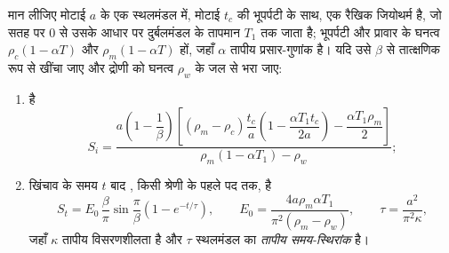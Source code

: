 \begin{proposition}[खिंचाव प्रतिरूप में अवधसान]\label{prop:b2:basins-compared:stretching}
मान लीजिए मोटाई $a$ के एक स्थलमंडल में, मोटाई $t_c$ की भूपर्पटी के साथ, एक रैखिक जियोथर्म है, जो
सतह पर $0$ से उसके आधार पर दुर्बलमंडल के तापमान $T_1$ तक जाता है; भूपर्पटी और प्रावार के
घनत्व $\rho_c(1 - \alpha T)$ और $\rho_m(1 - \alpha T)$ हों, जहाँ $\alpha$ तापीय
प्रसार-गुणांक है। यदि उसे $\beta$ से तात्क्षणिक रूप से खींचा जाए और द्रोणी को
घनत्व $\rho_w$ के जल से भरा जाए:
\begin{enumerate}
  \item {} है
  \[
    S_i = \frac{a\left(1 - \dfrac{1}{\beta}\right)\left[(\rho_m - \rho_c)\dfrac{t_c}{a}
          \left(1 - \dfrac{\alpha T_1 t_c}{2a}\right) - \dfrac{\alpha T_1 \rho_m}{2}\right]}
          {\rho_m(1 - \alpha T_1) - \rho_w};
  \]
  \item खिंचाव के समय $t$ बाद , किसी श्रेणी के पहले पद तक, है
  \[
    S_t = E_0\,\frac{\beta}{\pi}\sin\frac{\pi}{\beta}\left(1 - e^{-t/\tau}\right),\qquad
    E_0 = \frac{4a\rho_m\alpha T_1}{\pi^2(\rho_m - \rho_w)},\qquad
    \tau = \frac{a^2}{\pi^2\kappa},
  \]
  जहाँ $\kappa$ तापीय विसरणशीलता है और $\tau$ स्थलमंडल का \emph{तापीय समय-स्थिरांक}
  है।
\end{enumerate}
\end{proposition}


